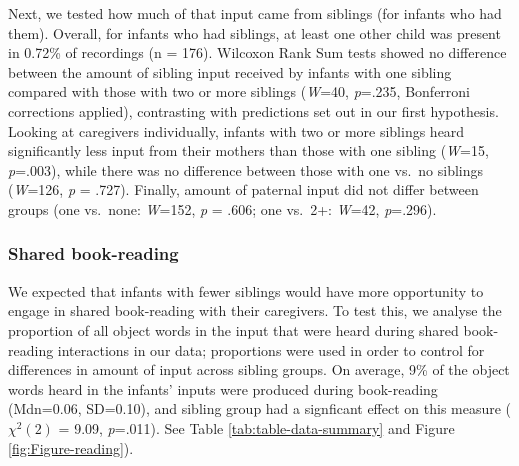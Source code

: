 \documentclass[
  english,
  man,floatsintext]{apa6}
\begin{document}
Next, we tested how much of that input came from siblings (for infants who had them). Overall, for infants who had siblings, at least one other child was present in 0.72\% of recordings (n = 176). Wilcoxon Rank Sum tests showed no difference between the amount of sibling input received by infants with one sibling compared with those with two or more siblings (\emph{W}=40, \emph{p}=.235, Bonferroni corrections applied), contrasting with predictions set out in our first hypothesis. Looking at caregivers individually, infants with two or more siblings heard significantly less input from their mothers than those with one sibling (\emph{W}=15, \emph{p}=.003), while there was no difference between those with one vs.~no siblings (\emph{W}=126, \emph{p} = .727). Finally, amount of paternal input did not differ between groups (one vs.~none: \emph{W}=152, \emph{p} = .606; one vs.~2+: \emph{W}=42, \emph{p}=.296).

\hypertarget{shared-book-reading}{%
\subsubsection{Shared book-reading}\label{shared-book-reading}}

We expected that infants with fewer siblings would have more opportunity to engage in shared book-reading with their caregivers. To test this, we analyse the proportion of all object words in the input that were heard during shared book-reading interactions in our data; proportions were used in order to control for differences in amount of input across sibling groups. On average, 9\% of the object words heard in the infants' inputs were produced during book-reading (Mdn=0.06, SD=0.10), and sibling group had a signficant effect on this measure (\(\chi^2 (2)\) = 9.09, \emph{p}=.011). See Table \ref{tab:table-data-summary} and Figure \ref{fig:Figure-reading}).
\end{document}
